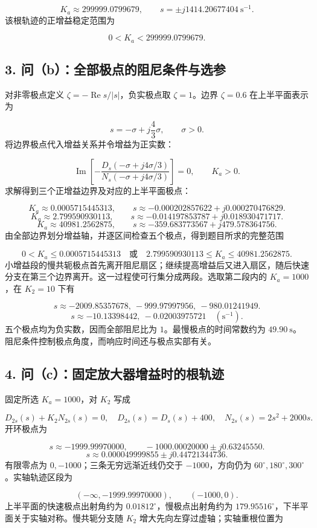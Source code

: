 \documentclass[UTF8,a4paper,11pt]{ctexart}
\begin{document}
\[K_a\approx299999.0799679,\qquad s=\pm j1414.20677404\ \mathrm{s}^{-1}.\]
该根轨迹的正增益稳定范围为

\[0<K_a<299999.0799679.\]
\subsection*{3. 问（b）：全部极点的阻尼条件与选参}
对非零极点定义 $\zeta=-\operatorname{Re}s/|s|$，负实极点取 $\zeta=1$。边界 $\zeta=0.6$ 在上半平面表示为

\[s=-\sigma+j\frac43\sigma,\qquad \sigma>0.\]
将边界极点代入增益关系并令增益为正实数：

\[\operatorname{Im}\!\left[-\frac{D_s(-\sigma+j4\sigma/3)}{N_s(-\sigma+j4\sigma/3)}\right]=0,\qquad K_a>0.\]
求解得到三个正增益边界及对应的上半平面极点：

\[K_a\approx0.0005715445313,\qquad s\approx-0.000202857622+j0.000270476829.\]
\[K_a\approx2.799590930113,\qquad s\approx-0.014197853787+j0.018930471717.\]
\[K_a\approx40981.2562875,\qquad s\approx-359.683773567+j479.578364756.\]
由全部边界划分增益轴，并逐区间检查五个极点，得到题目所求的完整范围

\[0<K_a\le0.0005715445313\quad\text{或}\quad2.799590930113\le K_a\le40981.2562875.\]
小增益段的慢共轭极点首先离开阻尼扇区；继续提高增益后又进入扇区，随后快速分支在第三个边界离开。这一过程使可行集分成两段。选取第二段内的 $K_a=1000$，在 $K_2=10$ 下有

\[s\approx-2009.85357678,\ -999.97997956,\ -980.01241949.\]
\[s\approx-10.13398442,\ -0.02003975721\quad(\mathrm{s}^{-1}).\]
五个极点均为负实数，因而全部阻尼比为 $1$。最慢极点的时间常数约为 $49.90\ \mathrm{s}$。阻尼条件控制极点角度，而响应时间还与极点实部有关。

\subsection*{4. 问（c）：固定放大器增益时的根轨迹}
固定所选 $K_a=1000$，对 $K_2$ 写成

\[D_{2s}(s)+K_2N_{2s}(s)=0,\quad D_{2s}(s)=D_s(s)+400,\quad N_{2s}(s)=2s^2+2000s.\]
开环极点为

\[s\approx-1999.99970000,\qquad-1000.00020000\pm j0.63245550.\]
\[s\approx0.000049999855\pm j0.44721344736.\]
有限零点为 $0,-1000$；三条无穷远渐近线仍交于 $-1000$，方向仍为 $60^\circ,180^\circ,300^\circ$。实轴轨迹区段为

\[(-\infty,-1999.99970000),\qquad(-1000,0).\]
上半平面的快速极点出射角约为 $0.01812^\circ$，慢极点出射角约为 $179.95516^\circ$，下半平面关于实轴对称。慢共轭分支随 $K_2$ 增大先向左穿过虚轴；实轴重根位置为
\end{document}
